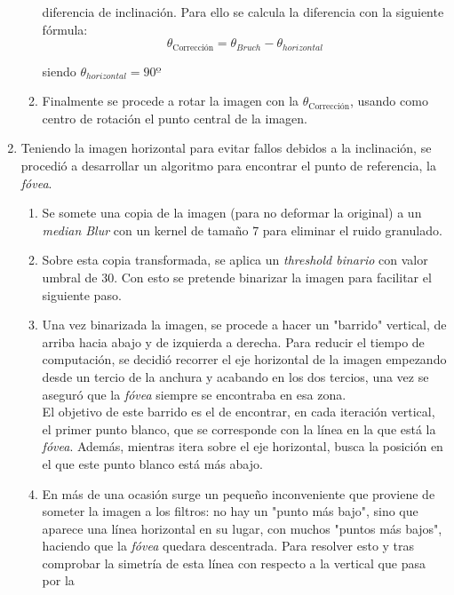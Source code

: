 \begin{enumerate}
\begin{enumerate}[label*=\arabic*.]
    diferencia de inclinación. Para ello se calcula la diferencia con
    la siguiente fórmula:
    \begin{equation*}
      \theta_\text{Corrección} = \theta_{Bruch} - \theta_{horizontal} 
    \end{equation*}
    \begin{center}
      siendo $\theta_{horizontal} = 90º$
    \end{center}
  \item Finalmente se procede a rotar la imagen con la
    $\theta_{\text{Corrección}}$, usando como centro de rotación el
    punto central de la imagen.
  \end{enumerate}
\item Teniendo la imagen horizontal para evitar fallos debidos a la
  inclinación, se procedió a desarrollar un algoritmo para encontrar
  el punto de referencia, la \emph{fóvea}.
  \begin{enumerate}[label*=\arabic*.]
  \item Se somete una copia de la imagen (para no deformar la
    original) a un \emph{median Blur} con un kernel de tamaño 7 para
    eliminar el ruido granulado.
  \item Sobre esta copia transformada, se aplica un \emph{threshold
      binario} con valor umbral de 30. Con esto se pretende binarizar
    la imagen para facilitar el siguiente paso.
  \item Una vez binarizada la imagen, se procede a hacer un "barrido"
    vertical, de arriba hacia abajo y de izquierda a derecha. Para
    reducir el tiempo de computación, se decidió recorrer el eje
    horizontal de la imagen empezando desde un tercio de la anchura y
    acabando en los dos tercios, una vez se aseguró que la
    \emph{fóvea} siempre se encontraba en esa zona. \\
    El objetivo de este barrido es el de encontrar, en cada iteración
    vertical, el primer punto blanco, que se corresponde con la línea
    en la que está la \emph{fóvea}. Además, mientras itera sobre el
    eje horizontal, busca la posición en el que este punto blanco está
    más abajo.
  \item En más de una ocasión surge un pequeño inconveniente que
    proviene de someter la imagen a los filtros: no hay un "punto más
    bajo", sino que aparece una línea horizontal en su lugar, con
    muchos "puntos más bajos", haciendo que la \emph{fóvea} quedara
    descentrada. Para resolver esto y tras comprobar la simetría de
    esta línea con respecto a la vertical que pasa por la

\end{enumerate}
\end{enumerate}
